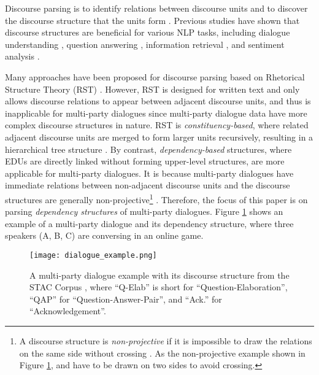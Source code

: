 \documentclass[letterpaper]{article} \usepackage{aaai19}  \usepackage{times}  \usepackage{helvet}  \usepackage{courier}  \usepackage{url}  \usepackage{graphicx}  \usepackage{amssymb}
\begin{document}
Discourse parsing is to identify relations between discourse units and to discover the discourse structure that the units form \cite{li2016discourse}. 
Previous studies have shown that discourse structures are beneficial for various NLP tasks, including 
dialogue understanding \cite{STACcorpus,Takanobu2018Weakly}, question answering \cite{verberne2007evaluating}, information retrieval \cite{seo2009online}, and sentiment analysis \cite{cambria2013new,bhatia2015better}.

Many approaches have been proposed for discourse parsing based on Rhetorical Structure Theory (RST) \cite{mann1988rhetorical}. 
However, RST is designed for written text and only allows discourse relations to appear between adjacent discourse units, and thus is inapplicable for multi-party dialogues \cite{afantenos2015discourse} since multi-party dialogue data have more complex discourse structures in nature.
 RST is \emph{constituency-based}, where related adjacent discourse units are merged to form larger units recursively, resulting in a hierarchical tree structure \cite{li2014recursive}. By contrast,  \emph{dependency-based} structures, where EDUs are directly linked without forming upper-level structures, are more applicable for multi-party dialogues. It is because multi-party dialogues have immediate relations between non-adjacent discourse units and the discourse structures are generally non-projective\footnote{A discourse structure is \emph{non-projective} if it is impossible to draw the relations on the same side without crossing \cite{mcdonald2005non}. As the non-projective example shown in Figure \ref{dialogue_example},  and  have to be drawn on two sides to avoid crossing.} 
 \cite{morey2018dependency}.
Therefore, the focus of this paper is on parsing \emph{dependency structures} of multi-party dialogues.
Figure \ref{dialogue_example} shows an example of a multi-party dialogue and its dependency structure, where three speakers (A, B, C) are conversing in an online game. 

\begin{figure}[ht]
	\centering
	\texttt{[image: dialogue\_example.png]}
    \caption{A multi-party dialogue example with its discourse structure from the STAC Corpus \cite{STACcorpus}, where ``Q-Elab'' is short for ``Question-Elaboration'', ``QAP'' for ``Question-Answer-Pair'', and ``Ack.'' for ``Acknowledgement''.}
    \label{dialogue_example}
\end{figure}
\end{document}

